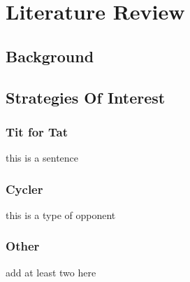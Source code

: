 
\chapter{Literature Review}\label{ch:literature}
    \section{Background}
    \section{Strategies Of Interest}
        \subsection{Tit for Tat}
        this is a sentence
        \subsection{Cycler}
        this is a type of opponent
        \subsection{Other}
        add at least two here